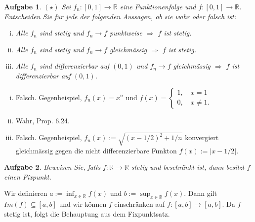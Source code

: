 \documentclass[a4paper, 20]{exam}
\newtheorem{ex}{Aufgabe}
\newcommand\RR{\mathbb{R}}
\begin{document}
\begin{ex}{$(\star)$}
Sei $f_n:[0,1] \longrightarrow \RR$ eine Funktionenfolge und $f:[0,1] \longrightarrow \RR$. Entscheiden Sie f\"ur jede der folgenden Aussagen, ob sie wahr oder falsch ist:
\begin{enumerate}[i.)]
\item
Alle $f_n$ sind stetig und $f_n \longrightarrow f$ punktweise $\Longrightarrow$ $f$ ist stetig. 
\item
Alle $f_n$ sind stetig und $f_n \longrightarrow f$ gleichm\"assig $\Longrightarrow$ $f$ ist stetig. 
\item
Alle $f_n$ sind differenzierbar auf $(0,1)$ und $f_n \longrightarrow f$ gleichm\"assig $\Longrightarrow$ $f$ ist differenzierbar auf $(0,1)$. 
\end{enumerate}
\end{ex}
\begin{solution}
\begin{enumerate}[i.)]
\item
Falsch. Gegenbeispiel, $f_n(x)=x^n$ und $f(x)=\begin{cases} 1, \quad x=1 \\ 0,\quad x \neq 1. \end{cases}$
\item
Wahr, Prop. 6.24.
\item
Falsch. Gegenbeispiel, $f_n(x):= \sqrt{(x-1/2)^2+1/n}$ konvergiert gleichmässig gegen die nicht differenzierbare Funkton $f(x):= |x-1/2|.$ \\
\end{enumerate}
\end{solution}





\begin{ex}
Beweisen Sie, falls $f:\RR \longrightarrow \RR$ stetig und beschr\"ankt ist, dann besitzt $f$ einen Fixpunkt.
\end{ex}
\begin{solution}
Wir definieren $a:=\inf_{x\in \RR} f(x)$ und $b:=\sup_{x\in \RR} f(x)$. Dann gilt $Im(f) \subseteq [a,b]$ und wir k\"onnen $f$ einschr\"anken auf $f:[a,b] \longrightarrow [a,b]$. Da $f$ stetig ist, folgt die Behauptung aus dem Fixpunktsatz.
\end{solution}
\end{document}
